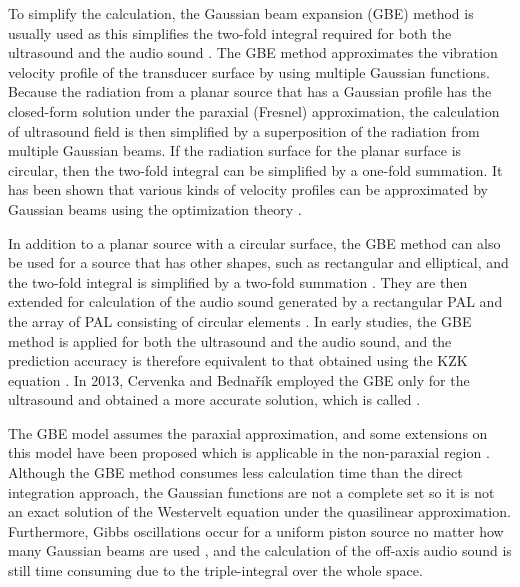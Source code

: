 To simplify the calculation, the Gaussian beam expansion (GBE) method is usually used {as this} simplifies the two-fold integral required for both the ultrasound and the audio sound \cite{Wen1988DiffractionBeamField, Cervenka2013NonparaxialModelParametric}.
The GBE method approximates the vibration velocity profile of the transducer surface by {using} multiple Gaussian functions.
Because the radiation from a planar source that has a Gaussian profile has the closed-form solution under the paraxial (Fresnel) approximation, the calculation of ultrasound field is then simplified by a superposition of the radiation from multiple Gaussian beams.
If the radiation surface for the planar surface is circular, {then} the two-fold integral can be simplified by a one-fold summation.
It has been shown that various kinds of velocity profiles can be approximated by Gaussian beams using the optimization theory \cite{Wen1988DiffractionBeamField, Ding1996SimpleCalculationApproach, Ding2000SimplifiedAlgorithmSecondorder, Ding2003ExtensionsGaussianBeam, Ding2004SimplifiedAlgorithmSecondorder, Ding2004NotesGaussianBeam, Ding2005SupplementaryNotesGaussian, Cervenka2015StructureMultiGaussianBeam}. 

In addition {to a} planar source {with} a circular surface, the GBE method can also be used for {a} source that has other shapes, such as rectangular and elliptical, and the two-fold integral is simplified by a two-fold summation \cite{Ding2003ExtensionsGaussianBeam, Ding2004NotesGaussianBeam, Ding2005SupplementaryNotesGaussian}.
They are then extended for calculation of the audio sound generated by a rectangular PAL \cite{Jun2004FastFieldScheme, Yang2005ModelingFiniteamplitudeSound, Masunaga2012HarmonicDistortionMeasurement} and the array of PAL consisting of circular elements \cite{Ye2010ModelingParametricLoudspeakers}.
In early studies, the GBE method is applied for both the ultrasound and the audio sound, and the prediction accuracy is therefore {equivalent to} that {obtained using the} KZK equation \cite{Ye2010ModelingParametricLoudspeakers}.
In 2013, Cervenka and Bednařík employed the GBE only for the ultrasound and {obtained} a more accurate solution, which is called  \cite{Cervenka2013NonparaxialModelParametric}.

The GBE model assumes the paraxial approximation, and some extensions on this model have been proposed which is applicable in the non-paraxial region \cite{Zhao2009NonparaxialMultiGaussianBeam, Wang2017TwodimensionalAnalyticModeling}.
Although the GBE method consumes less calculation time than the direct integration approach, the Gaussian functions are not a complete set so it is not an exact solution of the Westervelt equation under the quasilinear approximation. 
Furthermore, Gibbs oscillations occur for a uniform piston source no matter how many Gaussian beams are used \cite{Wen1988DiffractionBeamField, Cervenka2015StructureMultiGaussianBeam}, and the calculation of the off-axis audio sound is still time consuming due to the triple-integral over the whole space.

